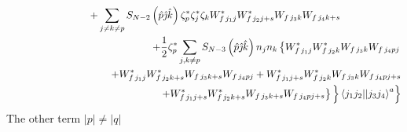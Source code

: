 \documentclass{article}
\begin{document}
\begin{eqnarray}
&&  \notag \\
&&+\sum_{j\neq k\neq p}S_{N-2}\left( \hat{p}\hat{\jmath}\hat{k}\right) \zeta
_{p}^{\ast }\zeta _{j}^{\ast }\zeta _{k}W_{f\,j_{1}j}^{\ast
}W_{f\,j_{2}j+s}^{\ast }W_{f\,j_{3}k}W_{f\,j_{4}k+s}\qquad \qquad \qquad \\
&&\qquad \quad +\frac{1}{2}\zeta _{p}^{\ast }\sum_{j,k\neq p}S_{N-3}\left( 
\hat{p}\hat{\jmath}\hat{k}\right) n_{j}n_{k}\left\{ W_{f\,j_{1}j}^{\ast
}W_{f\,j_{2}k}^{\ast }W_{f\,j_{3}k}W_{f\,j_{4}pj}\right.  \notag \\
&&\qquad \qquad \qquad +W_{f\,j_{1}j}^{\ast }W_{f\,j_{2}k+s}^{\ast
}W_{f\,j_{3}k+s}W_{f\,j_{4}pj}+W_{f\,j_{1}j+s}^{\ast }W_{f\,j_{2}k}^{\ast
}W_{f\,j_{3}k}W_{f\,j_{4}pj+s}  \notag \\
&&\qquad \qquad \qquad \qquad \qquad \qquad \qquad \left. \left. \left.
+W_{f\,j_{1}j+s}^{\ast }W_{f\,j_{2}k+s}^{\ast
}W_{f\,j_{3}k+s}W_{f\,j_{4}pj+s}\right\} \underset{}{\overset{}{}}\right\}
\left\langle j_{1}j_{2}||j_{3}j_{4}\right\rangle ^{a}\right\}
\end{eqnarray}%
The other term $\left| p\right| \neq \left| q\right| $
\end{document}
